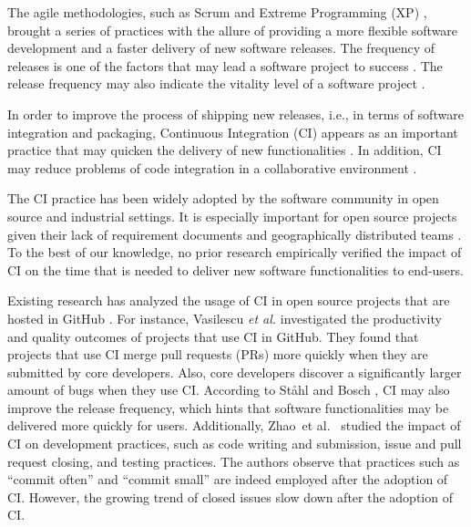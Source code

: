	The agile methodologies, such as Scrum
	\cite{Schwaber1997-cc} and Extreme Programming (XP) \cite{Beck2000-ja}, brought
	a series of practices with the allure of providing a more flexible software
	development and a faster delivery of new software releases. The frequency of
	releases is one of the factors that may lead a software project to success
	\cite{Chen2005-jd,Wohlin1995-wg}. The release frequency may also indicate the
	vitality level of a software project \cite{Crowston2003-ig}.
	
	In order to improve the process of shipping new releases, i.e., in terms of
	software integration and packaging, Continuous Integration (CI) appears as an
	important practice that may quicken the delivery of new functionalities
	\cite{Laukkanen2015-ab}. In addition, CI may reduce problems of code
	integration in a collaborative environment \cite{Vasilescu2015-tj}.
	
	The CI practice has been widely adopted by the software community
	\cite{Duvall2007-tb} in open source and industrial settings. It is
	especially important for open source projects given their lack of requirement
	documents and geographically distributed teams \cite{Vasilescu2015-tj}. To the
	best of our knowledge, no prior research empirically verified the impact
	of CI on the time that is needed to deliver new software functionalities to
	end-users.
	
	Existing research has analyzed the usage of CI in open source projects that are
	hosted in GitHub \cite{Hilton2016-xy,Vasilescu2015-tj,Vasilescu2015-tn}. For
	instance, Vasilescu \textit{et al.} \cite{Vasilescu2015-tn} investigated the
	productivity and quality outcomes of projects that use CI in GitHub. They found
	that projects that use CI merge pull requests (PRs) more quickly when they are
	submitted by core developers. Also, core developers discover a significantly
	larger amount of bugs when they use CI. According to St{\aa}hl and Bosch
	\cite{Stahl:2014:MCI:2562355.2562828}, CI may also improve the release
	frequency, which hints that software functionalities may be delivered more
	quickly for users. Additionally, Zhao~et al.~\cite{zhao2017impact} studied the
	impact of CI on development practices, such as code writing and submission,
	issue and pull request closing, and testing practices. The authors observe that
	practices such as ``commit often'' and ``commit small'' are indeed employed
	after the adoption of CI. However, the growing trend of closed issues slow down
	after the adoption of CI.
	
